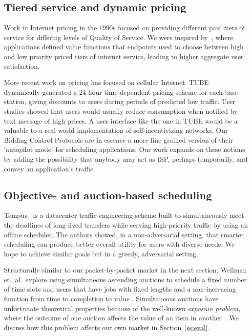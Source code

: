 \subsection{Tiered service and dynamic pricing}
Work in Internet pricing in the 1990s focused on providing different
paid tiers of service for differing levels of Quality of Service.  We
were inspired by~\cite{cocchi93}, where applications defined value
functions that endpoints used to choose between high and low priority
priced tiers of internet service, leading to higher aggregate user satisfaction.

More recent work on pricing has focused on cellular
Internet. TUBE~\cite{tube12} dynamically generated a 24-hour
time-dependent pricing scheme for each base station, giving discounts
to users during periods of predicted low traffic. User studies showed that users would
usually reduce consumption when notified by text message of high prices.
A user interface like the
one in TUBE would be a valuable to a real world implementation of
self-incentivizing networks. Our Bidding-Control Protocols are in
essence a more fine-grained version of their 'autopilot mode' for scheduling
applications.  Our work expands on these notions by adding
the possibility that anybody may act as ISP, perhaps temporarily, and convey an application's traffic.

\subsection{Objective- and auction-based scheduling}
Tempus~\cite{tempus14} is a datacenter traffic-engineering scheme built to simultaneously meet the deadlines of long-lived transfers while serving high-priority traffic by using an offline scheduler.
The authors showed, in a non-adversarial setting, that smarter scheduling can produce better overall utility for users with diverse needs. We hope to achieve similar goals but in a greedy, adversarial setting.

Structurally similar to our packet-by-packet market in the next section,
Wellman et.~al.~explore using simultaneous ascending auctions to
schedule a fixed number of time slots and users that have jobs with
fixed lengths and a non-increasing function from time to completion to
value \cite{wellman01, wellman05}. Simultaneous auctions have
unfortunate theoretical properties because of the well-known
\emph{exposure problem}, where the outcome of one auction affects the
value of an item in another~\cite{milgrom00, englmaier06}. We discuss how this problem affects
our own market in Section~\ref{ss:eval}.






















